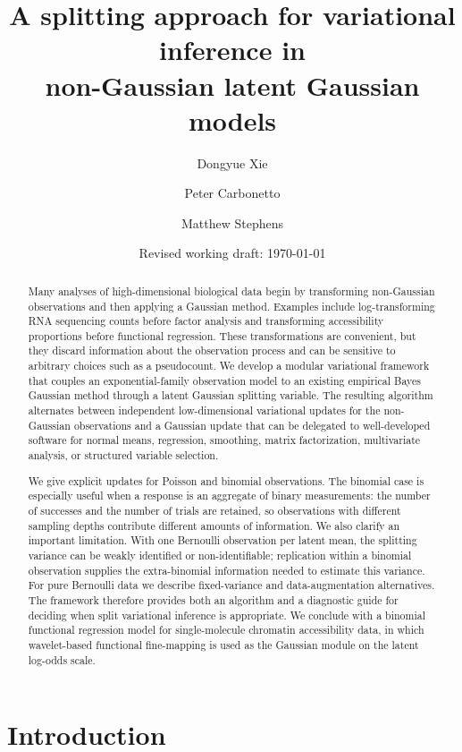 \documentclass[11pt]{article}
\title{A splitting approach for variational inference in\\
non-Gaussian latent Gaussian models}
\author{Dongyue Xie \and Peter Carbonetto \and Matthew Stephens}
\date{Revised working draft: \today}
\begin{document}
\maketitle

\begin{abstract}
Many analyses of high-dimensional biological data begin by transforming
non-Gaussian observations and then applying a Gaussian method. Examples
include log-transforming RNA sequencing counts before factor analysis and
transforming accessibility proportions before functional regression. These
transformations are convenient, but they discard information about the
observation process and can be sensitive to arbitrary choices such as a
pseudocount. We develop a modular variational framework that couples an
exponential-family observation model to an existing empirical Bayes Gaussian
method through a latent Gaussian splitting variable. The resulting algorithm
alternates between independent low-dimensional variational updates for the
non-Gaussian observations and a Gaussian update that can be delegated to
well-developed software for normal means, regression, smoothing, matrix
factorization, multivariate analysis, or structured variable selection.

We give explicit updates for Poisson and binomial observations. The binomial
case is especially useful when a response is an aggregate of binary
measurements: the number of successes and the number of trials are retained,
so observations with different sampling depths contribute different amounts
of information. We also clarify an important limitation. With one Bernoulli
observation per latent mean, the splitting variance can be weakly identified
or non-identifiable; replication within a binomial observation supplies the
extra-binomial information needed to estimate this variance. For pure
Bernoulli data we describe fixed-variance and data-augmentation alternatives.
The framework therefore provides both an algorithm and a diagnostic guide for
deciding when split variational inference is appropriate. We conclude with a
binomial functional regression model for single-molecule chromatin
accessibility data, in which wavelet-based functional fine-mapping is used as
the Gaussian module on the latent log-odds scale.
\end{abstract}

\section{Introduction}
\end{document}
